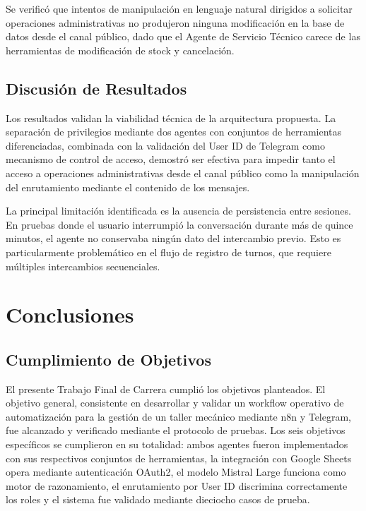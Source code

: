 \documentclass[12pt,a4paper]{report}
\begin{document}
Se verificó que intentos de manipulación en lenguaje natural dirigidos a solicitar operaciones administrativas no produjeron ninguna modificación en la base de datos desde el canal público, dado que el Agente de Servicio Técnico carece de las herramientas de modificación de stock y cancelación.

\section{Discusión de Resultados}

Los resultados validan la viabilidad técnica de la arquitectura propuesta. La separación de privilegios mediante dos agentes con conjuntos de herramientas diferenciadas, combinada con la validación del User ID de Telegram como mecanismo de control de acceso, demostró ser efectiva para impedir tanto el acceso a operaciones administrativas desde el canal público como la manipulación del enrutamiento mediante el contenido de los mensajes.

La principal limitación identificada es la ausencia de persistencia entre sesiones. En pruebas donde el usuario interrumpió la conversación durante más de quince minutos, el agente no conservaba ningún dato del intercambio previo. Esto es particularmente problemático en el flujo de registro de turnos, que requiere múltiples intercambios secuenciales.

\chapter{Conclusiones}

\section{Cumplimiento de Objetivos}

El presente Trabajo Final de Carrera cumplió los objetivos planteados. El objetivo general, consistente en desarrollar y validar un workflow operativo de automatización para la gestión de un taller mecánico mediante n8n y Telegram, fue alcanzado y verificado mediante el protocolo de pruebas. Los seis objetivos específicos se cumplieron en su totalidad: ambos agentes fueron implementados con sus respectivos conjuntos de herramientas, la integración con Google Sheets opera mediante autenticación OAuth2, el modelo Mistral Large funciona como motor de razonamiento, el enrutamiento por User ID discrimina correctamente los roles y el sistema fue validado mediante dieciocho casos de prueba.
\end{document}
